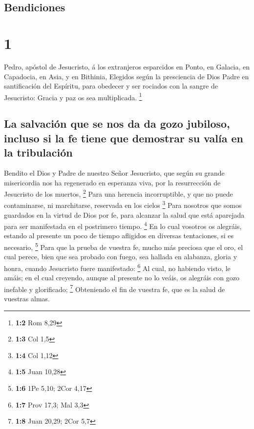 \hypertarget{bendiciones}{%
\subsection{Bendiciones}\label{bendiciones}}

\hypertarget{section}{%
\section{1}\label{section}}

 Pedro, apóstol de Jesucristo, á los extranjeros
esparcidos en Ponto, en Galacia, en Capadocia, en Asia, y en Bithinia,
 Elegidos según la presciencia de Dios Padre en
santificación del Espíritu, para obedecer y ser rociados con la sangre
de Jesucristo: Gracia y paz os sea multiplicada. \footnote{\textbf{1:2}
  Rom 8,29}

\hypertarget{la-salvaciuxf3n-que-se-nos-da-da-gozo-jubiloso-incluso-si-la-fe-tiene-que-demostrar-su-valuxeda-en-la-tribulaciuxf3n}{%
\subsection{La salvación que se nos da da gozo jubiloso, incluso si la
fe tiene que demostrar su valía en la
tribulación}\label{la-salvaciuxf3n-que-se-nos-da-da-gozo-jubiloso-incluso-si-la-fe-tiene-que-demostrar-su-valuxeda-en-la-tribulaciuxf3n}}

 Bendito el Dios y Padre de nuestro Señor Jesucristo, que
según su grande misericordia nos ha regenerado en esperanza viva, por la
resurrección de Jesucristo de los muertos, \footnote{\textbf{1:3} Col
  1,5}  Para una herencia incorruptible, y que no puede
contaminarse, ni marchitarse, reservada en los cielos \footnote{\textbf{1:4}
  Col 1,12}  Para nosotros que somos guardados en la
virtud de Dios por fe, para alcanzar la salud que está aparejada para
ser manifestada en el postrimero tiempo. \footnote{\textbf{1:5} Juan
  10,28}  En lo cual vosotros os alegráis, estando al
presente un poco de tiempo afligidos en diversas tentaciones, si es
necesario, \footnote{\textbf{1:6} 1Pe 5,10; 2Cor 4,17} 
Para que la prueba de vuestra fe, mucho más preciosa que el oro, el cual
perece, bien que sea probado con fuego, sea hallada en alabanza, gloria
y honra, cuando Jesucristo fuere manifestado: \footnote{\textbf{1:7}
  Prov 17,3; Mal 3,3}  Al cual, no habiendo visto, le
amáis; en el cual creyendo, aunque al presente no lo veáis, os alegráis
con gozo inefable y glorificado; \footnote{\textbf{1:8} Juan 20,29; 2Cor
  5,7}  Obteniendo el fin de vuestra fe, que es la salud
de vuestras almas.

